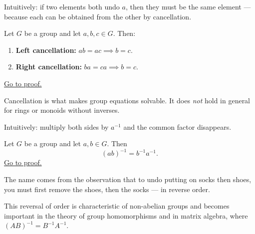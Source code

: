 \begin{remark*}
\end{remark*}



\begin{remark}
Intuitively: if two elements both undo $a$, then they must be
the same element --- because each can be obtained from the other
by cancellation.
\end{remark}

\begin{proposition}
\label{prop:group-cancellation-in-groups}
Let $G$ be a group and let $a, b, c \in G$. Then:
\begin{enumerate}[label=(\roman*)]
  \item \textbf{Left cancellation:} $ab = ac \implies b = c$.
  \item \textbf{Right cancellation:} $ba = ca \implies b = c$.
\end{enumerate}
\hyperref[prf:group-cancellation]{Go to proof.}
\end{proposition}


\begin{remark}
Cancellation is what makes group equations solvable.
It does \emph{not} hold in general for rings or monoids without inverses.

Intuitively: multiply both sides by $a^{-1}$ and the common factor disappears.
\end{remark}

\begin{proposition}
\label{prop:group-socks-shoes}
Let $G$ be a group and let $a, b \in G$. Then
\[
(ab)^{-1} = b^{-1} a^{-1}.
\]
\hyperref[prf:group-socks-shoes]{Go to proof.}
\end{proposition}

\begin{remark*}
\end{remark*}


\begin{remark}
The name comes from the observation that to undo putting on socks
then shoes, you must first remove the shoes, then the socks ---
in reverse order.

This reversal of order is characteristic of non-abelian groups and
becomes important in the theory of group homomorphisms and
in matrix algebra, where $(AB)^{-1} = B^{-1}A^{-1}$.
\end{remark}
